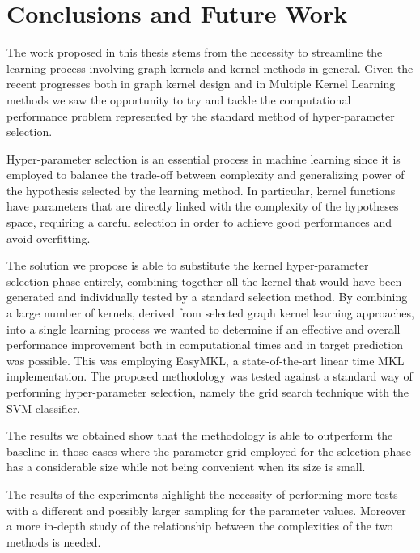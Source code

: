\chapter{Conclusions and Future Work}
\label{Chapter5}

The work proposed in this thesis stems from the necessity to streamline the learning
process involving graph kernels and kernel methods in general.
Given the recent progresses both in graph kernel design and in Multiple Kernel Learning
methods we saw the opportunity to try and tackle the computational performance
problem represented by the standard method of hyper-parameter selection.

Hyper-parameter selection is an essential process in machine learning since it
is employed to balance the trade-off between complexity and generalizing power of
the hypothesis selected by the learning method.
In particular, kernel functions have parameters that are directly linked with the
complexity of the hypotheses space, requiring a careful selection in order to 
achieve good performances and avoid overfitting.

The solution we propose is able to substitute the kernel hyper-parameter selection
phase entirely, combining together all the kernel that would have been generated
and individually tested by a standard selection method.
By combining a large number of kernels, derived from selected graph kernel
learning approaches, into a single learning process we wanted to determine if an
effective and overall performance improvement both in computational times and 
in target prediction was possible.
This was employing EasyMKL, a state-of-the-art linear time MKL implementation.
The proposed methodology was tested against a standard way of performing hyper-parameter
selection, namely the grid search technique with the SVM classifier.


The results we obtained show that the methodology is able to outperform the baseline
in those cases where the parameter grid employed for the selection phase has a
considerable size while not being convenient when its size is small.


The results of the experiments highlight the necessity of performing more 
tests with a different and possibly larger sampling for the parameter values.
Moreover a more in-depth study of the relationship between the complexities of
the two methods is needed.

